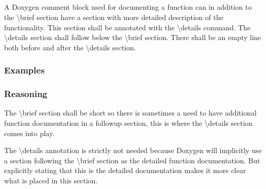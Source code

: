 \subsection*{\doxygenRule{}}

A Doxygen comment block used for documenting a function can in addition to the \textbackslash brief section have a section with more detailed description of the functionality. This section shall be annotated with the \textbackslash details command. The \textbackslash details section shall follow below the \textbackslash brief section. There shall be an empty line both before and after the \textbackslash details section.

\subsubsection*{Examples}

\noindent
\begin{minipage}[t]{\codelstwidth\textwidth}
    
\end{minipage}\hfill
\begin{minipage}[t]{\codelstwidth\textwidth}
    
\end{minipage}

\subsubsection*{Reasoning}

The \textbackslash brief section shall be short so there is sometimes a need to have additional function documentation in a followup section, this is where the \textbackslash details section comes into play.

The \textbackslash details annotation is strictly not needed because Doxygen will implicitly use a section following the \textbackslash brief section as the detailed function documentation. But explicitly stating that this is the detailed documentation makes it more clear what is placed in this section.
